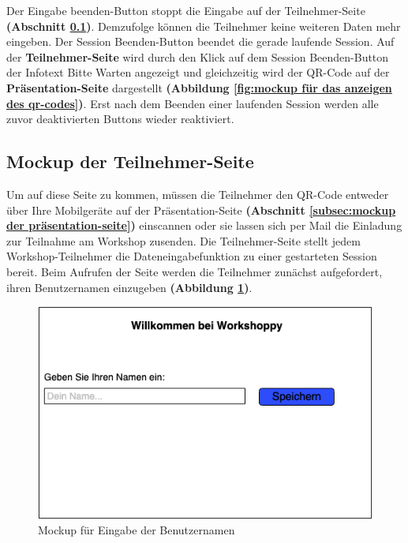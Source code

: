 \begin{enumerate}
Der \glqq Eingabe beenden\grqq{}-Button stoppt die Eingabe auf der Teilnehmer-Seite \textbf{(Abschnitt \ref{subsec:Mockup der Teilnehmer-Seite})}. Demzufolge können die Teilnehmer keine weiteren Daten mehr eingeben. Der \glqq Session Beenden\grqq{}-Button beendet die gerade laufende Session. Auf der \textbf{Teilnehmer-Seite} wird durch den Klick auf dem \glqq Session Beenden\grqq{}-Button der Infotext \glqq Bitte Warten\grqq{} angezeigt und gleichzeitig wird der QR-Code auf der \textbf{Präsentation-Seite} dargestellt \textbf{(Abbildung \ref{fig:mockup für das anzeigen des qr-codes})}. Erst nach dem Beenden einer laufenden Session werden alle zuvor deaktivierten Buttons wieder reaktiviert.
\end{enumerate}

\subsection{Mockup der Teilnehmer-Seite}
\label{subsec:Mockup der Teilnehmer-Seite}
Um auf diese Seite zu kommen, müssen die Teilnehmer den QR-Code entweder über Ihre Mobilgeräte auf der Präsentation-Seite \textbf{(Abschnitt \ref{subsec:mockup der präsentation-seite})} einscannen oder sie lassen sich per Mail die Einladung zur Teilnahme am Workshop zusenden. Die Teilnehmer-Seite stellt jedem Workshop-Teilnehmer die Dateneingabefunktion zu einer gestarteten Session bereit. Beim Aufrufen der Seite werden die Teilnehmer zunächst aufgefordert, ihren Benutzernamen einzugeben \textbf{(Abbildung \ref{fig:mockup für eingabe der benutzernamen})}.

\begin{figure}[H]
  \begin{center}
    \includegraphics[scale=0.45]{img/teilnehmerseite}
	\caption{Mockup für Eingabe der Benutzernamen}  
	\label{fig:mockup für eingabe der benutzernamen}
  \end{center}   
\end{figure}


